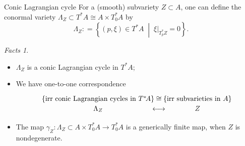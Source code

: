 \documentclass[pdf]{beamer}
\numberwithin{equation}{section}
\theoremstyle{plain}
\theoremstyle{plain}
\theoremstyle{remark}
\newtheorem{facts}[theorem]{Facts}
\begin{document}
\begin{frame}[fragile]{Conic Lagrangian cycle}
For a (smooth) subvariety $Z \subset A$, one can define the conormal variety $\Lambda_Z \subset T^*A \cong A \times T_0^*A$  by 
$$\Lambda_Z: = \left\{ (p,\xi) \in T^*A  \;\middle|\; \xi|_{T_p^* Z} = 0 \right\}.$$ 

\begin{facts}
\begin{itemize}
	\item $\Lambda_Z$ is a conic Lagrangian cycle in $T^*A$;
	\item We have one-to-one correspondence
\[\begin{tikzcd}[ampersand replacement=\&,column sep={-4mm}, row sep={-1mm}]
	{\left\{ \text{irr conic Lagrangian cycles in $T^*\!A$} \right\}} \& \cong \& {\left\{ \text{irr subvarieties in $A$} \right\}} \\
	{\Lambda_Z} \& \longleftrightarrow \& Z
\end{tikzcd}\]
	\item The map $\gamma_Z: \Lambda_Z \subset A \times T_0^*A \longrightarrow T_0^*A $ is a generically finite map, when $Z$ is nondegenerate.
	
\end{itemize}
\end{facts}
\end{frame}
\begingroup
\setlength{\abovedisplayskip}{4pt}
\setlength{\belowdisplayskip}{4pt}
\end{document}
